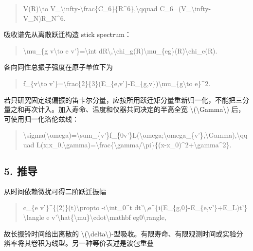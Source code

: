\documentclass[UTF8,openany,11pt,fontset=fandol]{ctexbook}
\begin{document}
\begin{quote}
V(R)\textbackslash to
V\_\textbackslash infty-\textbackslash frac\{C\_6\}\{R\^{}6\},\textbackslash qquad
C\_6=(V\_\textbackslash infty-V\_N)R\_N\^{}6.
\end{quote}

吸收谱先从离散跃迁构造 stick spectrum：

\begin{quote}
\textbackslash mu\_\{g v\textbackslash to e v'\}=\textbackslash int
dR\textbackslash,\textbackslash chi\_g(R)\textbackslash mu\_\{eg\}(R)\textbackslash chi\_e(R).
\end{quote}

各向同性总振子强度在原子单位下为

\begin{quote}
f\_\{v\textbackslash to
v'\}=\textbackslash frac\{2\}\{3\}(E\_\{e,v'\}-E\_\{g,v\})\textbar\textbackslash mu\_\{g\textbackslash to
e\}\textbar\^{}2.
\end{quote}

若只研究固定线偏振的笛卡尔分量，应按所用跃迁矩分量重新归一化，不能把三分量之和再次计入。加入寿命、温度和仪器共同决定的半高全宽
\textbackslash(\textbackslash Gamma\textbackslash)
后，可使用归一化洛伦兹线：

\begin{quote}
\textbackslash sigma(\textbackslash omega)=\textbackslash sum\_\{v'\}f\_\{0v'\}L(\textbackslash omega;\textbackslash omega\_\{v'\},\textbackslash Gamma),\textbackslash qquad
L(x;x\_0,\textbackslash gamma)=\textbackslash frac\{\textbackslash gamma/\textbackslash pi\}\{(x-x\_0)\^{}2+\textbackslash gamma\^{}2\}.
\end{quote}

\subsection{\texorpdfstring{\textbf{5.
推导}}{5. 推导}}\label{ux63a8ux5bfc}

从时间依赖微扰可得二阶跃迁振幅

\begin{quote}
c\_\{e v'\}\^{}\{(2)\}(t)\textbackslash propto
-i\textbackslash int\_0\^{}t
dt'\textbackslash,e\^{}\{i(E\_\{g,0\}-E\_\{e,v'\}+E\_L)t'\}
\textbackslash langle e
v'\textbar\textbackslash hat\{\textbackslash mu\}\textbackslash cdot\textbackslash mathbf
e\textbar g0\textbackslash rangle,
\end{quote}

故长振铃时间给出离散的
\textbackslash(\textbackslash delta\textbackslash)-型吸收。有限寿命、有限观测时间或实验分辨率将其卷积为线型。另一种等价表述是波包重叠
\end{document}
